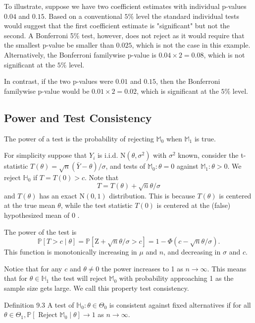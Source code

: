 \documentclass[10pt]{article}
\begin{document}
To illustrate, suppose we have two coefficient estimates with individual p-values $0.04$ and $0.15$. Based on a conventional $5 \%$ level the standard individual tests would suggest that the first coefficient estimate is "significant" but not the second. A Bonferroni 5\% test, however, does not reject as it would require that the smallest p-value be smaller than $0.025$, which is not the case in this example. Alternatively, the Bonferroni familywise $\mathrm{p}$-value is $0.04 \times 2=0.08$, which is not significant at the $5 \%$ level.

In contrast, if the two p-values were $0.01$ and $0.15$, then the Bonferroni familywise p-value would be $0.01 \times 2=0.02$, which is significant at the $5 \%$ level.

\subsection{Power and Test Consistency}
The power of a test is the probability of rejecting $\mathbb{M}_{0}$ when $\mathbb{M}_{1}$ is true.

For simplicity suppose that $Y_{i}$ is i.i.d. $\mathrm{N}\left(\theta, \sigma^{2}\right)$ with $\sigma^{2}$ known, consider the t-statistic $T(\theta)=\sqrt{n}(\bar{Y}-\theta) / \sigma$, and tests of $\mathbb{M}_{0}: \theta=0$ against $\mathbb{M}_{1}: \theta>0$. We reject $\mathbb{H}_{0}$ if $T=T(0)>c$. Note that
$$
T=T(\theta)+\sqrt{n} \theta / \sigma
$$
and $T(\theta)$ has an exact $\mathrm{N}(0,1)$ distribution. This is because $T(\theta)$ is centered at the true mean $\theta$, while the test statistic $T(0)$ is centered at the (false) hypothesized mean of 0 .

The power of the test is
$$
\mathbb{P}[T>c \mid \theta]=\mathbb{P}[\mathrm{Z}+\sqrt{n} \theta / \sigma>c]=1-\Phi(c-\sqrt{n} \theta / \sigma) .
$$
This function is monotonically increasing in $\mu$ and $n$, and decreasing in $\sigma$ and $c$.

Notice that for any $c$ and $\theta \neq 0$ the power increases to 1 as $n \rightarrow \infty$. This means that for $\theta \in \mathbb{H}_{1}$ the test will reject $\mathbb{M}_{0}$ with probability approaching 1 as the sample size gets large. We call this property test consistency.

Definition 9.3 A test of $\mathbb{H}_{0}: \theta \in \Theta_{0}$ is consistent against fixed alternatives if for all $\theta \in \Theta_{1}, \mathbb{P}\left[\right.$ Reject $\left.\mathbb{M}_{0} \mid \theta\right] \rightarrow 1$ as $n \rightarrow \infty$.
\end{document}
